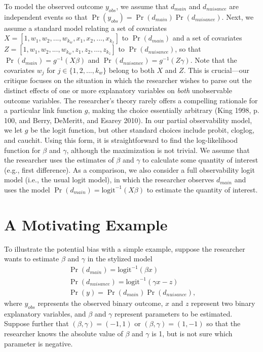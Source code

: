 \documentclass[10pt]{article}
\begin{document}
To model the observed outcome $y_{obs}$, we assume that $d_{main}$ and $d_{nuisance}$ are independent events so that $\Pr(y_{obs}) = \Pr(d_{main})\Pr(d_{nuisance})$.
Next, we assume a standard model relating a set of covariates $X = [1, w_1, w_2,..., w_{k_w}, x_1, x_2,..., x_{k_x}]$ to $\Pr(d_{main})$ and a set of covariates $Z = [1, w_1, w_2,..., w_{k_w}, z_1, z_2,..., z_{k_z}]$ to $\Pr(d_{nuisance})$, so that $\Pr(d_{main}) = g^{-1}(X\beta)$ and $\Pr(d_{nuisance}) = g^{-1}(Z\gamma)$.
Note that the covariates $w_j$ for $j \in \{1, 2,..., k_w\}$ belong to both $X$ and $Z$. 
This is crucial---our critique focuses on the situation in which the researcher wishes to parse out the distinct effects of one or more explanatory variables on \textit{both} unobservable outcome variables. 
The researcher's theory rarely offers a compelling rationale for a particular link function $g$, making the choice essentially arbitrary (King 1998, p. 100, and Berry, DeMeritt, and Esarey 2010).
In our partial observability model, we let $g$ be the logit function, but other standard choices include probit, cloglog, and cauchit.
Using this form, it is straightforward to find the log-likelihood function for $\beta$ and $\gamma$, although the maximization is not trivial. 
We assume that the researcher uses the estimates of $\beta$ and $\gamma$ to calculate some quantity of interest (e.g., first difference). 
As a comparison, we also consider a full observability logit model (i.e., the usual logit model), in which the researcher observes $d_{main}$ and uses the model $\Pr(d_{main}) = \text{logit}^{-1}(X\beta)$ to estimate the quantity of interest.

\section*{A Motivating Example}

To illustrate the potential bias with a simple example, suppose the researcher wants to estimate $\beta$ and $\gamma$ in the stylized model
\begin{gather*}
\Pr(d_{main}) = \text{logit}^{-1}(\beta x)\nonumber\\
\Pr(d_{nuisance}) = \text{logit}^{-1}(\gamma x - z)\nonumber\\
\Pr(y) = \Pr(d_{main})\Pr(d_{nuisance})\text{,}\nonumber
\end{gather*}
where $y_{obs}$ represents the observed binary outcome, $x$ and $z$ represent two binary explanatory variables, and $\beta$ and $\gamma$ represent parameters to be estimated. 
Suppose further that $(\beta, \gamma) = (-1, 1)$ or $(\beta, \gamma) = (1, -1)$ so that the researcher knows the absolute value of $\beta$ and $\gamma$ is 1, but is not sure which parameter is negative.
\end{document}
